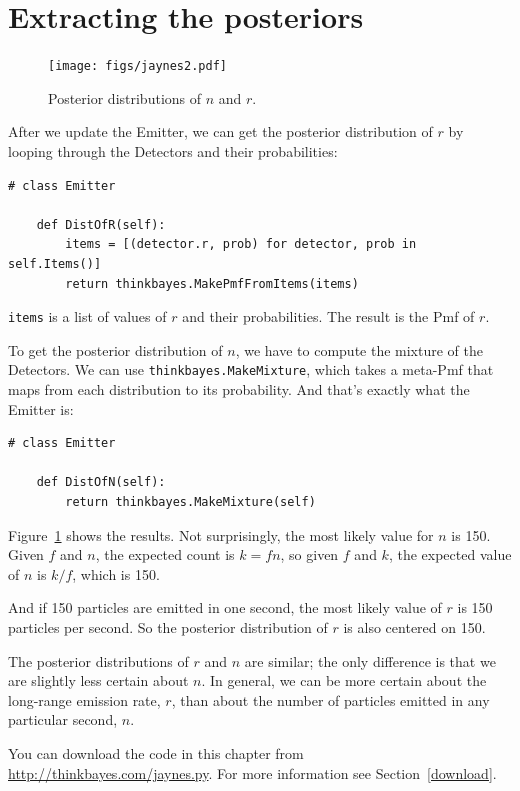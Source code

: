 \documentclass[12pt]{book}
\begin{document}
\section{Extracting the posteriors}

\begin{figure}
\centerline{\texttt{[image: figs/jaynes2.pdf]}}
\caption{Posterior distributions of $n$ and $r$.}
\label{fig.jaynes2}
\end{figure}

After we update the Emitter, we can get the posterior distribution
of $r$ by looping through the Detectors and their probabilities:

\begin{verbatim}
# class Emitter

    def DistOfR(self):
        items = [(detector.r, prob) for detector, prob in self.Items()]
        return thinkbayes.MakePmfFromItems(items)
\end{verbatim}

{\tt items} is a list of values of $r$ and their probabilities.
The result is the Pmf of $r$.

To get the posterior distribution of $n$, we have to compute
the mixture of the Detectors.  We can use 
{\tt thinkbayes.MakeMixture}, which takes a meta-Pmf that maps
from each distribution to its probability.  And that's exactly
what the Emitter is:

\begin{verbatim}
# class Emitter

    def DistOfN(self):
        return thinkbayes.MakeMixture(self)
\end{verbatim}

Figure~\ref{fig.jaynes2} shows the results.  Not surprisingly, the
most likely value for $n$ is 150.  Given $f$ and $n$, the expected
count is $k = f n$, so given $f$ and $k$, the expected value of $n$ is
$k / f$, which is 150.

And if 150 particles are emitted in one second, the most likely value
of $r$ is 150 particles per second.  So the posterior distribution of
$r$ is also centered on 150.

The posterior distributions of $r$ and $n$ are similar;
the only difference is that we are slightly less certain about $n$.
In general, we can be more certain about the long-range emission rate,
$r$, than about the number of particles emitted in any particular second,
$n$.

You can download the code in this chapter from
\url{http://thinkbayes.com/jaynes.py}.  For more information see
Section~\ref{download}.
\end{document}
